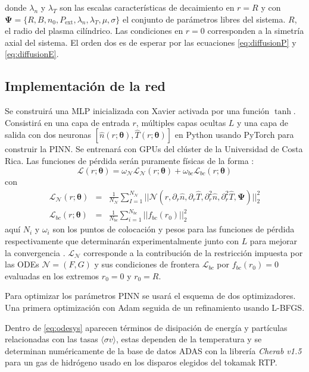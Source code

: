 donde $\lambda_n$ y $\lambda_T$ son las escalas características de decaimiento en $r = R$ y con $\bm{\Psi} = \{R, B, n_0, P_\text{ext}, \lambda_n, \lambda_T, \mu, \sigma\}$ el conjunto de parámetros libres del sistema. $R$, el radio del plasma cilíndrico. Las condiciones en $r = 0$ corresponden a la simetría axial del sistema. El orden dos es de esperar por las ecuaciones \eqref{eq:diffusionP} y \eqref{eq:diffusionE}.
\subsection{Implementación de la red}
Se construirá una MLP inicializada con Xavier activada por una función $\tanh$. Consistirá en una capa de entrada $r$, múltiples capas ocultas $L$ y una capa de salida con dos neuronas $[\hat{n}(r; \bm{\theta}), \hat{T}(r; \bm{\theta})]$ en Python usando PyTorch \cite{pytorch} para construir la PINN. Se entrenará con GPUs del clúster de la Universidad de Costa Rica. Las funciones de pérdida serán puramente físicas de la forma \cite{raissi2019}:
\begin{equation}
	\mathcal{L}(r; \bm{\theta}) = \omega_\mathcal{N} \mathcal{L}_\mathcal{N} (r; \bm{\theta})+ \omega_{bc} \mathcal{L}_{bc}(r; \bm{\theta})
\end{equation}
con
{\small
\begin{eqnarray}
	\mathcal{L}_\mathcal{N} (r; \bm{\theta}) &=&\frac{1}{N_\mathcal{N}}\sum\limits_{I=1}^{N_\mathcal{N}} || \mathcal{N}(r, \partial_r \hat{n}, \partial_r \hat{T}, \partial_r^2 \hat{n}, \partial_r^2\hat{T}, \bm{\Psi}) ||_2^2\\
	\mathcal{L}_{bc}(r; \bm{\theta}) &=& \frac{1}{N_{bc}}\sum\limits_{i=1}^{N_{bc}} || f_{bc}(r_0)||_2^2
\end{eqnarray}}
aquí $N_i$ y $\omega_i$ son los puntos de colocación y pesos  para las funciones de pérdida respectivamente que determinarán experimentalmente junto con $L$ para mejorar la convergencia . $\mathcal{L}_\mathcal{N}$ corresponde a la contribución de la restricción impuesta por las ODEs  $\mathcal{N} = (F,G)$ y sus condiciones de frontera $\mathcal{L}_{bc}$ por $f_{bc}(r_0) = 0$ evaluadas en los extremos $r_0 = 0$ y $r_0 = R$.

Para optimizar los parámetros PINN se usará el esquema de dos optimizadores. Una primera optimización con Adam seguida de un refinamiento usando L-BFGS.

Dentro de \eqref{eq:odesys} aparecen términos de disipación de energía y partículas relacionadas con las tasas $\langle \sigma v \rangle$, estas dependen de la temperatura y se determinan numéricamente de la base de datos ADAS con la librería \textit{Cherab v1.5} \cite{cherab} para un gas de hidrógeno usado en los disparos elegidos del tokamak RTP.
\vspace{- 5 mm}
